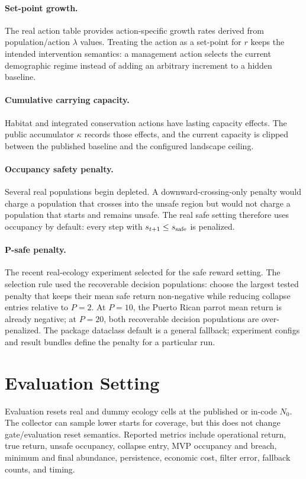 \documentclass[11pt]{article}
\begin{document}
\paragraph{Set-point growth.}
The real action table provides action-specific growth rates derived from
population/action $\lambda$ values. Treating the action as a set-point for $r$
keeps the intended intervention semantics: a management action selects the
current demographic regime instead of adding an arbitrary increment to a hidden
baseline.

\paragraph{Cumulative carrying capacity.}
Habitat and integrated conservation actions have lasting capacity effects. The
public accumulator $\kappa$ records those effects, and the current capacity is
clipped between the published baseline and the configured landscape ceiling.

\paragraph{Occupancy safety penalty.}
Several real populations begin depleted. A downward-crossing-only penalty would
charge a population that crosses into the unsafe region but would not charge a
population that starts and remains unsafe. The real safe setting therefore uses
occupancy by default: every step with $s_{t+1} \le s_{\mathrm{safe}}$ is penalized.

\paragraph{P-safe penalty.}
The recent real-ecology experiment selected  for the
safe reward setting. The selection rule used the recoverable decision
populations: choose the largest tested penalty that keeps their mean safe return
non-negative while reducing collapse entries relative to $P=2$. At $P=10$, the
Puerto Rican parrot mean return is already negative; at $P=20$, both recoverable
decision populations are over-penalized. The package dataclass default is a
general fallback; experiment configs and result bundles define the penalty for a
particular run.

\section{Evaluation Setting}

Evaluation resets real and dummy ecology cells at the published or in-code
$N_0$. The collector can sample lower starts for coverage, but this does not
change gate/evaluation reset semantics. Reported metrics include operational
return, true return, unsafe occupancy, collapse entry, MVP occupancy and breach,
minimum and final abundance, persistence, economic cost, filter error, fallback
counts, and timing.
\end{document}
